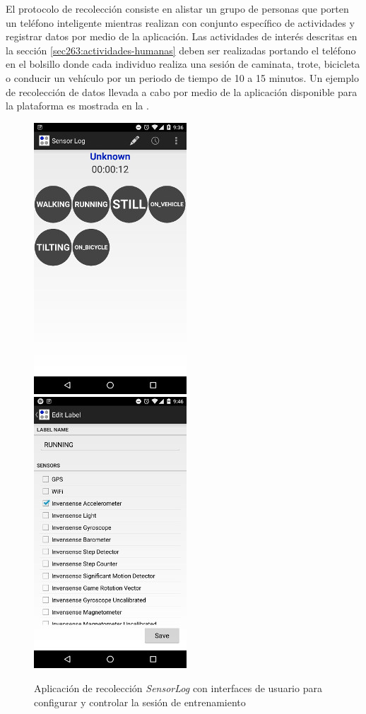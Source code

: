 El protocolo de recolección consiste en alistar un grupo de personas
que porten un teléfono inteligente mientras realizan con conjunto
específico de actividades y registrar datos por medio de la aplicación.
Las actividades de interés descritas en la sección \ref{sec263:actividades-humanas}
deben ser realizadas portando el teléfono en el bolsillo donde cada
individuo realiza una sesión de caminata, trote, bicicleta o conducir
un vehículo por un periodo de tiempo de 10 a 15 minutos. Un ejemplo
de recolección de datos llevada a cabo por medio de la aplicación
disponible para la plataforma  es mostrada en la . 

\begin{figure}[!tbph]
\begin{centering}
\includegraphics[scale=0.8]{capitulo-4/graphics/sensorlog1}\includegraphics[scale=0.8]{capitulo-4/graphics/sensorlog2}
\par\end{centering}
\caption[Aplicación de recolección \emph{SensorLog}]{\label{fig4:sensor-log}Aplicación de recolección \emph{SensorLog
}con interfaces de usuario para configurar y controlar la sesión de
entrenamiento}
\end{figure}

